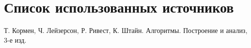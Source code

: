 \section*{Список использованных источников}

\begingroup
\renewcommand{\section}[2]{}
\begin{thebibliography}{}
	 Т. Кормен, Ч. Лейзерсон, Р. Ривест, К. Штайн. Алгоритмы. Построение и анализ, 3-е изд.
\end{thebibliography}
\endgroup

\newpage
